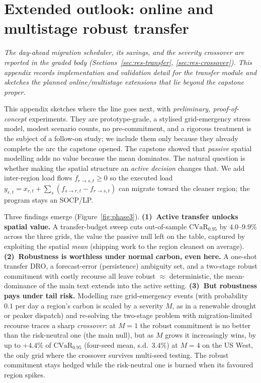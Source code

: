 \documentclass[12pt]{article}
\newcommand{\CVaR}{\mathrm{CVaR}}
\begin{document}
\section{Extended outlook: online and multistage robust transfer}\label{app:phase3}
\emph{The day-ahead migration scheduler, its savings, and the severity crossover are
reported in the graded body (Sections~\ref{sec:res-transfer},
\ref{sec:res-crossover}). This appendix records implementation and validation detail
for the transfer module and sketches the planned online/multistage extensions that
lie beyond the capstone proper.}

\medskip\noindent This appendix sketches where the line goes next, with
\emph{preliminary, proof-of-concept} experiments. They are prototype-grade, a
stylised grid-emergency stress model, modest scenario counts, no pre-commitment, and a rigorous treatment is the subject of a follow-on study; we include them only because
they already complete the arc the capstone opened. The capstone showed that
\emph{passive} spatial modelling adds no value because the mean dominates. The
natural question is whether making the spatial structure an \emph{active decision}
changes that. We add inter-region load flows $f_{r\to s,t}\ge0$ so the executed load
$y_{r,t}=x_{r,t}+\sum_s(f_{s\to r,t}-f_{r\to s,t})$ can migrate toward the cleaner
region; the program stays an SOCP/LP.

Three findings emerge (Figure~\ref{fig:phase3}). \textbf{(1)~Active transfer unlocks
spatial value.} A transfer-budget sweep cuts out-of-sample $\CVaR_{0.95}$ by
$4.0$--$9.9\%$ across the three grids, the value the passive null left on the
table, captured by exploiting the spatial \emph{mean} (shipping work to the region
cleanest on average). \textbf{(2)~Robustness is worthless under normal carbon, even
here.} A one-shot transfer DRO, a forecast-error (persistence) ambiguity set, and a
two-stage robust commitment with costly recourse all leave robust $\approx$
deterministic, the mean-dominance of the main text extends into the active
setting. \textbf{(3)~But robustness pays under tail risk.} Modelling rare
grid-emergency events (with probability $0.1$ per day a region's carbon is scaled by
a severity $M$, as in a renewable drought or peaker dispatch) and re-solving the
two-stage problem with migration-limited recourse traces a sharp \emph{crossover}:
at $M=1$ the robust commitment is no better than the risk-neutral one (the main
null), but as $M$ grows it increasingly wins, by up to $+4.4\%$ of $\CVaR_{0.95}$
(four-seed mean, s.d.\ $3.4\%$) at $M=4$ on the US West, the only grid where the
crossover survives multi-seed testing. The robust commitment stays hedged while the
risk-neutral one is burned when its favoured region spikes.
\end{document}
